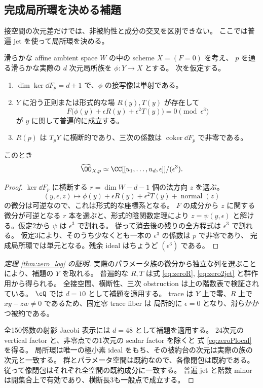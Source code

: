 \subsection{完成局所環を決める補題}
接空間の次元差だけでは、非被約性と成分の交叉を区別できない。
ここでは普遍 jet を使って局所環を決める。

\begin{lemma}\label{lem:jet_length_three}
滑らかな affine ambient space $W$ の中の scheme $X=(F=0)$ を考え、
$p$ を通る滑らかな実際の $d$ 次元局所族を $\phi:Y\to X$ とする。
次を仮定する。
\begin{enumerate}
\item $\dim\ker\dd F_p=d+1$ で、$\phi$ の接写像は単射である。
\item $Y$ に沿う正則または形式的な場 $R(y),T(y)$ が存在して
\[
 F\bigl(\phi(y)+\epsilon R(y)+\epsilon^2T(y)\bigr)
       =0\pmod{\epsilon^3}
\]
が $y$ に関して普遍的に成立する。
\item $R(p)$ は $T_pY$ に横断的であり、三次の係数は
$\operatorname{coker}\dd F_p$ で非零である。
\end{enumerate}
このとき
\[
 \widehat{\OO}_{X,p}\simeq\CC[[u_1,\ldots,u_d,\epsilon]]/(\epsilon^3).
\]
\end{lemma}

\begin{proof}
$\ker\dd F_p$ に横断する $r=\dim W-d-1$ 個の法方向 $z$ を選ぶ。
\[
 (y,\epsilon,z)\longmapsto
 \phi(y)+\epsilon R(y)+\epsilon^2T(y)+\operatorname{normal}(z)
\]
の微分は可逆なので、これは形式的な座標系となる。
$F$ の成分から $z$ に関する微分が可逆となる $r$ 本を選ぶと、形式的陰関数定理により
$z=\psi(y,\epsilon)$ と解ける。仮定2から $\psi$ は $\epsilon^3$ で割れる。
従って消去後の残りの全方程式は $\epsilon^3$ で割れる。
仮定3により、そのうち少なくとも一本の $\epsilon^3$ の係数は $p$ で非零であり、
完成局所環では単元となる。残余 ideal はちょうど $(\epsilon^3)$ である。
\end{proof}

\begin{proof}[定理 \ref{thm:zero_log} の証明]
実際のパラメータ族の微分から独立な列を選ぶことにより、補題の $Y$ を取れる。
普遍的な $R,T$ は式 \eqref{eq:zeroR}, \eqref{eq:zero2jet} と群作用から得られる。
全接空間、横断性、三次 obstruction は上の階数表で検証されている。
$\cQ$ では $d=10$ として補題を適用する。
trace は $Y$ 上で零、$R$ 上で $xy-zw\ne0$ であるため、固定零 trace fiber は
局所的に $\epsilon=0$ となり、滑らかかつ被約である。

全150係数の射影 Jacobi 表示には $d=48$ として補題を適用する。
24次元の vertical factor と、非零点での1次元の scalar factor を除くと
式 \eqref{eq:zeroPlocal} を得る。
局所環は唯一の極小素 ideal をもち、その被約台の次元は実際の族の次元と一致する。
群とパラメータ空間は既約なので、各像閉包は既約である。
従って像閉包はそれぞれ全空間の既約成分に一致する。
普遍 jet と階数 minor は開集合上で有効であり、横断長3も一般点で成立する。
\end{proof}

